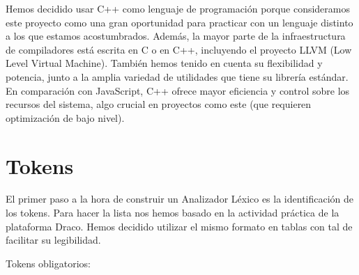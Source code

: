 \documentclass{article}
\begin{document}
\vspace{0.5cm}

Hemos decidido usar C++ como lenguaje de programación porque consideramos este proyecto como una gran oportunidad para practicar con un lenguaje distinto a los que estamos acostumbrados. Además, la mayor parte de la infraestructura de compiladores está escrita en C o en C++, incluyendo el proyecto LLVM (Low Level Virtual Machine). También hemos tenido en cuenta su flexibilidad y potencia, junto a la amplia variedad de utilidades que tiene su librería estándar. En comparación con JavaScript, C++ ofrece mayor eficiencia y control sobre los recursos del sistema, algo crucial en proyectos como este (que requieren optimización de bajo nivel). 

\newpage

\section{Tokens}
El primer paso a la hora de construir un Analizador Léxico es la identificación de los tokens. Para hacer la lista nos hemos basado en la actividad práctica de la plataforma Draco. Hemos decidido utilizar el mismo formato en tablas con tal de facilitar su legibilidad.

Tokens obligatorios:
\end{document}
